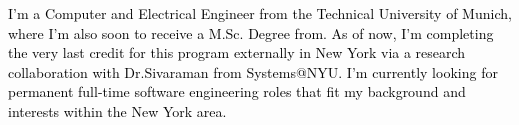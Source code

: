 \documentclass[10pt,a4paper,ragged2e,withhyper]{altacv}
\begin{document}



\makecvheader

\textcolor{black}{
I'm a Computer and Electrical Engineer from the Technical University of Munich, 
where I'm also soon to receive a M.Sc. Degree from. As of now, 
I'm completing the very last credit for this program externally in New York via 
a research collaboration with Dr.Sivaraman from Systems@NYU. I'm currently looking 
for permanent full-time software engineering roles that fit my background and interests 
within the New York area.
}

\end{document}
